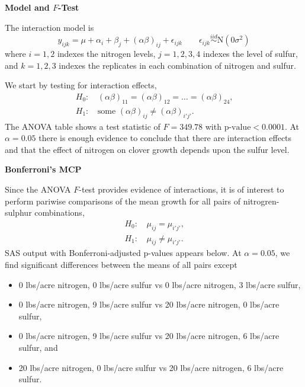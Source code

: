 \documentclass[11pt]{article}
\begin{document}
\begin{enumerate}
\textbf{Model and \(F\)-Test}

The interaction model is
\begin{equation*}
y_{ijk}=\mu+\alpha_i+\beta_j+(\alpha\beta)_{ij}+\epsilon_{ijk}\qquad
\epsilon_{ijk}\overset{iid}{\sim}\mathrm{N}(0\sigma^2)
\end{equation*}
where \(i=1,2\) indexes the nitrogen levels, \(j=1,2,3,4\) indexes the
level of sulfur, and \(k=1,2,3\) indexes the replicates in each combination
of nitrogen and sulfur.

We start by testing for interaction effects,
\begin{align*}
H_0\text{: }&(\alpha\beta)_{11}=(\alpha\beta)_{12}=\dots
=(\alpha\beta)_{24}\text{,} \\
H_1\text{: }&\text{some }(\alpha\beta)_{ij}\neq(\alpha\beta)_{i'j'}\text{.}
\end{align*}
The ANOVA table shows a test statistic of \(F=349.78\) with
\(\text{p-value}<0.0001\). At \(\alpha=0.05\) there is enough evidence to
conclude that there are interaction effects and that the effect of nitrogen on
clover growth depends upon the sulfur level.



\pagebreak
\textbf{Bonferroni's MCP}

Since the ANOVA \(F\)-test provides evidence of interactions, it is of
interest to perform pariwise comparisons of the mean growth for all pairs of
nitrogren-sulphur combinations,
\begin{align*}
H_0\text{: }&\mu_{ij}=\mu_{i'j'}\text{,} \\
H_1\text{: }&\mu_{ij}\neq\mu_{i'j'}\text{.}
\end{align*}
SAS output with Bonferroni-adjusted p-values appears below. At
\(\alpha=0.05\), we find significant differences between the means of all
pairs except
\begin{itemize}
\item 0 lbs/acre nitrogen, 0 lbs/acre sulfur vs
0 lbs/acre nitrogen, 3 lbs/acre sulfur,
\item  0 lbs/acre nitrogen, 9 lbs/acre sulfur vs
20 lbs/acre nitrogen, 0 lbs/acre sulfur,
\item 0 lbs/acre nitrogen, 9 lbs/acre sulfur vs
20 lbs/acre nitrogen, 6 lbs/acre sulfur, and
\item 20 lbs/acre nitrogen, 0 lbs/acre sulfur vs
20 lbs/acre nitrogen, 6 lbs/acre sulfur.
\end{itemize}


\end{enumerate}
\end{document}
